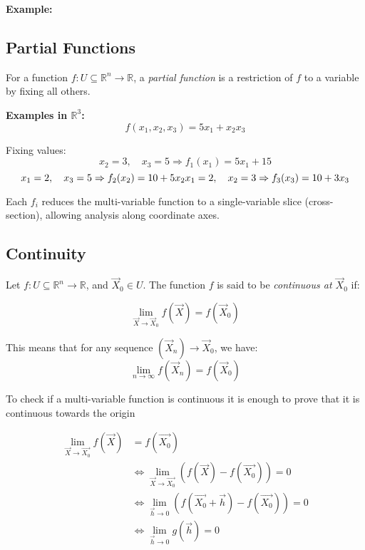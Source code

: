 \textbf{Example:}
\vspace{\baselineskip}



\subsection{Partial Functions}

For a function \( f: U \subseteq \mathbb{R}^n \to \mathbb{R} \), a \emph{partial function} is a restriction of \( f \) to a variable by fixing all others.
\vspace{\baselineskip}

\textbf{Examples in \( \mathbb{R}^3 \):}
\[
f(x_1, x_2, x_3) = 5x_1 + x_2 x_3
\]

Fixing values:
\[
x_2 = 3, \quad x_3 = 5 \Rightarrow f_1(x_1) = 5x_1 + 15 
\]
\[
x_1 = 2, \quad x_3 = 5 \Rightarrow f_2(x_2) = 10 + 5x_2 \\
x_1 = 2, \quad x_2 = 3 \Rightarrow f_3(x_3) = 10 + 3x_3
\]

Each \( f_i \) reduces the multi-variable function to a single-variable slice (cross-section), allowing analysis along coordinate axes.


\subsection{Continuity}

Let \( f : U \subseteq \mathbb{R}^n \to \mathbb{R} \), and \( \vec{X}_0 \in U \). The function \( f \) is said to be \emph{continuous at \( \vec{X}_0 \)} if:

\[
\lim_{\vec{X} \to \vec{X}_0} f(\vec{X}) = f(\vec{X}_0)
\]

This means that for any sequence \( (\vec{X}_n) \to \vec{X}_0 \), we have:
\[
\lim_{n \to \infty} f(\vec{X}_n) = f(\vec{X}_0)
\]

To check if a multi-variable function is continuous it is enough to prove that it is continuous towards the origin

\begin{align*}
    \lim_{\vec{X} \to \vec{X_0}}f(\vec{X}) &= f(\vec{X_0}) \\
    &\iff \lim_{\vec{X} \to \vec{X_0}} \left(f(\vec{X}) - f(\vec{X_0})\right) = 0 \\
    &\iff \lim_{\vec{h} \to 0} \left(f(\vec{X_0} + \vec{h}) - f(\vec{X_0})\right) = 0 \\
    &\iff \lim_{\vec{h} \to 0} g(\vec{h}) = 0
\end{align*}

